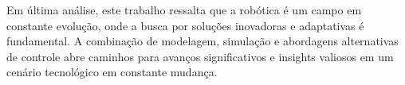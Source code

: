 Em última análise, este trabalho ressalta que a robótica é um campo em constante evolução, onde a busca por soluções inovadoras e adaptativas é fundamental. A combinação de modelagem, simulação e abordagens alternativas de controle abre caminhos para avanços significativos e insights valiosos em um cenário tecnológico em constante mudança.
